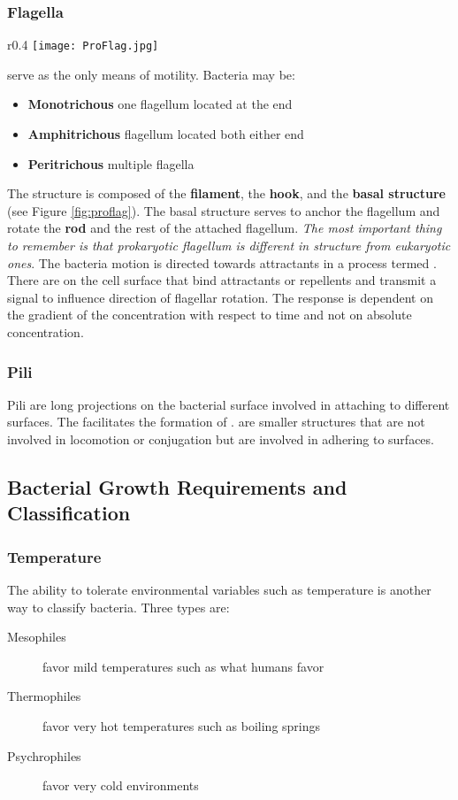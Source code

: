 \documentclass[../Bio_chemistryReview.tex]{subfiles}
\begin{document}
\subsubsection{Flagella}
\begin{wrapfigure}[10]{r}{0.4\textwidth}
    \centering
    \vspace{-12pt}
    \texttt{[image: ProFlag.jpg]}
    \caption{\color{blue}The Prokaryotic Flagellum}
    \label{fig:proflag}
\end{wrapfigure}
 serve as the only means of motility. Bacteria may be:
\begin{itemize}
    \item \textbf{Monotrichous} one flagellum located at the end
    \item \textbf{Amphitrichous} flagellum located both either end
    \item \textbf{Peritrichous} multiple flagella
\end{itemize}
The structure is composed of the \textbf{filament}, the \textbf{hook}, and the
\textbf{basal structure} (see Figure \ref{fig:proflag}). The basal structure
serves to anchor the flagellum and rotate the \textbf{rod} and the rest of the
attached flagellum.  
\textit{The most important thing to remember is that prokaryotic flagellum is
different in structure from eukaryotic ones}.
The bacteria motion is directed towards attractants in a process termed
. There are  on the cell surface
that bind attractants or repellents and transmit a signal to influence direction
of flagellar rotation. The response is dependent on the gradient of the
concentration with respect to time and not on absolute concentration.

\subsubsection{Pili}
Pili are long projections on the bacterial surface involved in attaching to
different surfaces. The  facilitates the formation of
.  are smaller structures that
are not involved in locomotion or conjugation but are involved in adhering to
surfaces.

\subsection{Bacterial Growth Requirements and Classification}
\subsubsection{Temperature}
The ability to tolerate environmental variables such as temperature is another
way to classify bacteria. Three types are:
\begin{description}
    \item[Mesophiles] favor mild temperatures such as what humans favor
    \item[Thermophiles] favor very hot temperatures such as boiling springs
    \item[Psychrophiles] favor very cold environments
\end{description}
\end{document}
